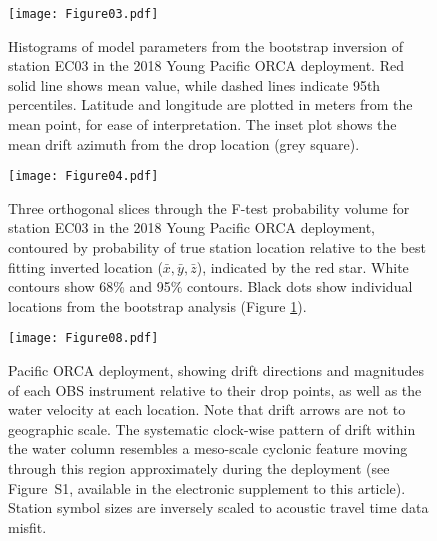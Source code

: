 \newpage

\begin{figure}[h]
\texttt{[image: Figure03.pdf]}
\caption{Histograms of model parameters from the bootstrap inversion of station EC03 in the 2018 Young Pacific ORCA deployment. Red solid line shows mean value, while dashed lines indicate 95th percentiles. Latitude and longitude are plotted in meters from the mean point, for ease of interpretation. The inset plot shows the mean drift azimuth from the drop location (grey square).}
\label{fig:one_sta_real_histograms}
\end{figure}

\newpage

\begin{figure}[h]
\texttt{[image: Figure04.pdf]}
\caption{ Three orthogonal slices through the F-test probability volume for station EC03 in the 2018 Young Pacific ORCA deployment, contoured by probability of true station location relative to the best fitting inverted location ($\bar{x},\bar{y},\bar{z}$), indicated by the red star. White contours show 68\% and 95\% contours. Black dots show individual locations from the bootstrap analysis (Figure \ref{fig:one_sta_real_histograms}). }
\label{fig:one_sta_real_ftests}
\end{figure}

\newpage

\begin{figure}[h]
\texttt{[image: Figure08.pdf]}
\caption{Pacific ORCA deployment, showing drift directions and magnitudes of each OBS instrument relative to their drop points, as well as the water velocity at each location. Note that drift arrows are not to geographic scale. The systematic clock-wise pattern of drift within the water column resembles a meso-scale cyclonic feature moving through this region approximately during the deployment (see Figure~S1, available in the electronic supplement to this article). Station symbol sizes are inversely scaled to acoustic travel time data misfit.}
\label{fig:meso_eddy}
\end{figure}

\newpage

